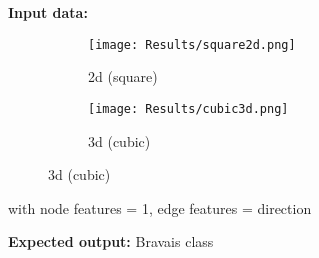 \vspace*{-0.5cm}
\textbf{Input data:}
\begin{figure}
    \centering
    \begin{subfigure}[t]{0.45\textwidth}
        \centering
        \texttt{[image: Results/square2d.png]}
        \caption{2d (square)}
    \end{subfigure}
    \hfill
    \begin{subfigure}[t]{0.45\textwidth}
        \centering
        \texttt{[image: Results/cubic3d.png]}
        \caption{3d (cubic)}
    \end{subfigure}
\end{figure}
with node features = 1, edge features = direction\par
\textbf{Expected output:} Bravais class